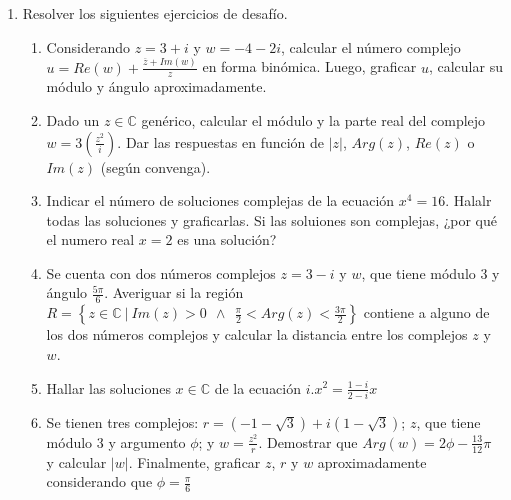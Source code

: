 \documentclass[a4paper]{article}
\newcommand{\answer}{\item[**]}
\newcommand{\exercise}{\item}
\newcommand{\df}[2]{\displaystyle\frac{#1}{#2}}
\newcommand{\conj}[1]{\overline{#1}}
\begin{document}
\begin{enumerate}
\begin{enumerate} [label=(\alph*)]
		\item En la ingeniería eléctrica, al analizar circuitos electrónicos, a menudo nos encontramos con parámetros conocido como "polos". Estos polos son fundamentales para determinar la estabilidad de un circuito. \\ Reglas: Si todos los polos tienen una parte real negativa, el circuito es estable. Si algún polo tiene una parte real positiva, el circuito es inestable. Si un par de polos se encuentran exactamente en el eje imaginario (parte real es cero), el circuito es marginalente estable. \\ Problema: Dado un circuito eléctrico que tiene tres polos: $P_1=5+2i$, $P_2=0+3i$ y $P_3=0-3i$, clasifica el circuito en estable, inestable inestable o marginalmente estable.
		\answer El sistema es inestable porque $Re(P_1)=5>0$

	\end{enumerate}
	
	\exercise Resolver los siguientes ejercicios de desafío. 
	\begin{enumerate} [label=(\alph*)]
		
		\item Considerando $z=3+i$ y $w=-4-2i$, calcular el número complejo $u=Re(w)+\df{\conj{z}+Im(w)}{z}$ en forma binómica. Luego, graficar $u$, calcular su módulo y ángulo aproximadamente.

		\item Dado un $z \in \mathbb{C}$ genérico, calcular el módulo y la parte real del complejo $w=3\left(\df{z^2}{i}\right)$. Dar las respuestas en función de $|z|$, $Arg(z)$, $Re(z)$ o $Im(z)$ (según convenga).

		\item Indicar el número de soluciones complejas de la ecuación $x^4=16$. Halalr todas las soluciones y graficarlas. Si las soluiones son complejas, ¿por qué el numero real $x=2$ es una solución?

		\item Se cuenta con dos números complejos $z=3-i$ y $w$, que tiene módulo 3 y ángulo $\df{5\pi}{6}$. Averiguar si la región $R=\left\{z\in\mathbb{C} ~|~ Im(z)>0 ~~\land~~ \df{\pi}{2}<Arg(z)<\df{3\pi}{2}\right\}$ contiene a alguno de los dos números complejos y calcular la distancia entre los complejos $z$ y $w$.

		\item Hallar las soluciones $x \in \mathbb{C}$ de la ecuación $i.x^2=\df{1-i}{2-i}x$

		\item Se tienen tres complejos: $r=(-1-\sqrt{3})+i(1-\sqrt{3})$; $z$, que tiene módulo 3 y argumento $\phi$; y $w=\df{z^2}{r}$. Demostrar que $Arg(w)=2\phi-\df{13}{12}\pi$ y calcular $|w|$. Finalmente, graficar $z$, $r$ y $w$ aproximadamente considerando que $\phi=\df{\pi}{6}$


\end{enumerate}
\end{enumerate}
\end{document}
